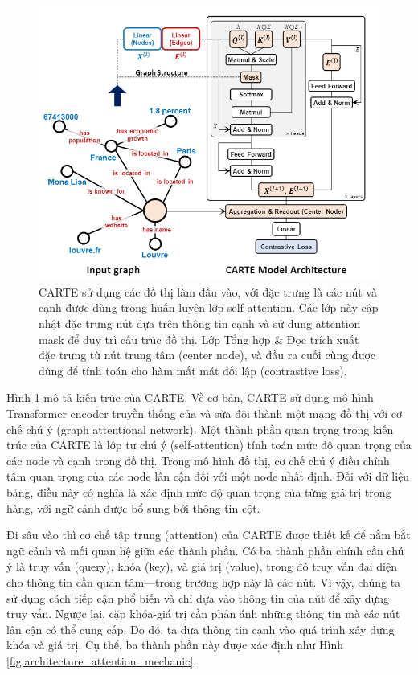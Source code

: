 \documentclass{article}
\begin{document}
\begin{figure} 
    \centering
    \includegraphics[scale = 0.8]{carte_architecture.png}
    \caption{CARTE sử dụng các đồ thị làm đầu vào, với đặc trưng là các nút và cạnh được dùng trong huấn luyện lớp self-attention. Các lớp này cập nhật đặc trưng nút dựa trên thông tin cạnh và sử dụng attention mask để duy trì cấu trúc đồ thị. Lớp Tổng hợp \& Đọc trích xuất đặc trưng từ nút trung tâm (center node), và đầu ra cuối cùng được dùng để tính toán cho hàm mất mát đối lập (contrastive loss).}
    \label{fig:carte_architecture}
\end{figure}

Hình \ref{fig:carte_architecture} mô tả kiến trúc của CARTE. Về cơ bản, CARTE sử dụng mô hình Transformer encoder truyền thống của và sửa đội thành một mạng đồ thị với cơ chế chú ý (graph attentional network). Một thành phần quan trọng trong kiến trúc của CARTE là lớp tự chú ý (self-attention) tính toán mức độ quan trọng của các node và cạnh trong đồ thị. Trong mô hình đồ thị, cơ chế chú ý điều chỉnh tầm quan trọng của các node lân cận đối với một node nhất định. Đối với dữ liệu bảng, điều này có nghĩa là xác định mức độ quan trọng của từng giá trị trong hàng, với ngữ cảnh được bổ sung bởi thông tin cột.

Đi sâu vào thì cơ chế tập trung (attention) của CARTE được thiết kế để nắm bắt ngữ cảnh và mối quan hệ giữa các thành phần. Có ba thành phần chính cần chú ý là truy vấn (query), khóa (key), và giá trị (value), trong đó truy vấn đại diện cho thông tin cần quan tâm—trong trường hợp này là các nút. Vì vậy, chúng ta sử dụng cách tiếp cận phổ biến và chỉ dựa vào thông tin của nút để xây dựng truy vấn. Ngược lại, cặp khóa-giá trị cần phản ánh những thông tin mà các nút lân cận có thể cung cấp. Do đó, ta đưa thông tin cạnh vào quá trình xây dựng khóa và giá trị. Cụ thể, ba thành phần này được xác định như Hình \ref{fig:architecture_attention_mechanic}.
\end{document}
